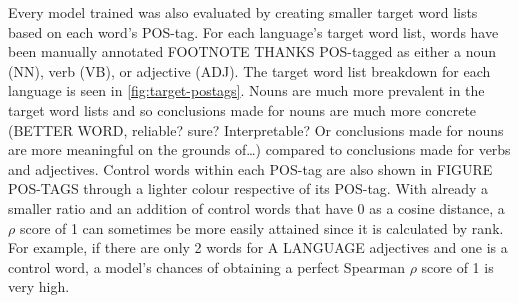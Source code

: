 Every model trained was also evaluated by creating smaller target word lists based on each word’s POS-tag. For each language’s target word list, words have been manually annotated FOOTNOTE THANKS POS-tagged as either a noun (NN), verb (VB), or adjective (ADJ). The target word list breakdown for each language is seen in \autoref{fig:target-postags}. Nouns are much more prevalent in the target word lists and so conclusions made for nouns are much more concrete (BETTER WORD, reliable? sure? Interpretable? Or conclusions made for nouns are more meaningful on the grounds of…) compared to conclusions made for verbs and adjectives. Control words within each POS-tag are also shown in FIGURE POS-TAGS through a lighter colour respective of its POS-tag. With already a smaller ratio and an addition of control words that have 0 as a cosine distance, a $\rho$ score of 1 can sometimes be more easily attained since it is calculated by rank. For example, if there are only 2 words for A LANGUAGE adjectives and one is a control word, a model’s chances of obtaining a perfect Spearman $\rho$ score of 1 is very high. 


